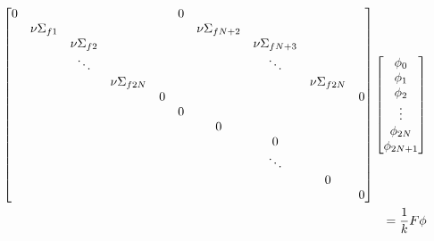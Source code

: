 \documentclass[11pt]{article} %
\begin{document}
\begin{landscape}
\begin{equation}
\begin{aligned}
\begin{bmatrix}
        0 &&&&         & 0&&&&         \\
        &\nu\Sigma_{f1}&&&  & &\nu\Sigma_{fN+2}&&&\\
        &&\nu\Sigma_{f2}&&  & &&\nu\Sigma_{fN+3}&&\\
        &&\ddots   &&  & &&\ddots     &&\\
        &&&\nu\Sigma_{f2N}& & &&&\nu\Sigma_{f2N} &\\
        &&&&0          & &&&&0          \\
        &&&&           & 0&&&&          \\
        &&&&           & &0&&&     \\
        &&&&           & &&0&&     \\
        &&&&           & &&\ddots&&     \\
        &&&&           & &&&0&     \\
        &&&&           & &&&&0     \\
    \end{bmatrix}\begin{bmatrix}
        \phi_0\\\phi_1\\\phi_2\\\vdots\\\phi_{2N}\\\phi_{2N+1}
    \end{bmatrix}& \\
    =\frac{1}{k}F\phi&\\
        \end{aligned}
    \end{equation}
    \label{eq:p2_mat}
\end{landscape}
\end{document}
